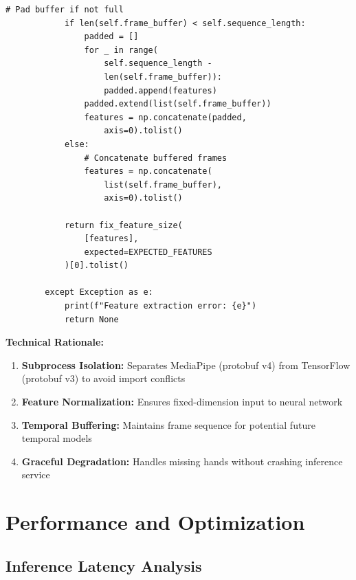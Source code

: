 \documentclass[11pt,a4paper,twoside]{report}
\begin{document}
\begin{lstlisting}[style=python, caption={Hand landmark extraction and feature normalization engine}, label=lst:recognizer]
            # Pad buffer if not full
            if len(self.frame_buffer) < self.sequence_length:
                padded = []
                for _ in range(
                    self.sequence_length - 
                    len(self.frame_buffer)):
                    padded.append(features)
                padded.extend(list(self.frame_buffer))
                features = np.concatenate(padded, 
                    axis=0).tolist()
            else:
                # Concatenate buffered frames
                features = np.concatenate(
                    list(self.frame_buffer), 
                    axis=0).tolist()

            return fix_feature_size(
                [features],
                expected=EXPECTED_FEATURES
            )[0].tolist()

        except Exception as e:
            print(f"Feature extraction error: {e}")
            return None
\end{lstlisting}

\textbf{Technical Rationale:}

\begin{enumerate}
    \item \textbf{Subprocess Isolation:} Separates MediaPipe (protobuf v4) from TensorFlow (protobuf v3) to avoid import conflicts
    \item \textbf{Feature Normalization:} Ensures fixed-dimension input to neural network
    \item \textbf{Temporal Buffering:} Maintains frame sequence for potential future temporal models
    \item \textbf{Graceful Degradation:} Handles missing hands without crashing inference service
\end{enumerate}

\newpage

\section{Performance and Optimization}
\label{sec:performance}

\subsection{Inference Latency Analysis}
\label{subsec:latency-analysis}
\end{document}
